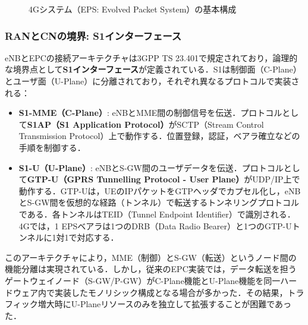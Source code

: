 \begin{figure}[htbp]
  \caption{4Gシステム（EPS: Evolved Packet System）の基本構成}
  \label{fig:epc_architecture}
\end{figure}

\subsubsection{RANとCNの境界: S1インターフェース}
eNBとEPCの接続アーキテクチャは3GPP TS 23.401で規定されており，論理的な境界点として\textbf{S1インターフェース}が定義されている\cite{3GPP_TS23401}．S1は制御面（C-Plane）とユーザ面（U-Plane）に分離されており，それぞれ異なるプロトコルで実装される：
\begin{itemize}
  \item \textbf{S1-MME（C-Plane）}: eNBとMME間の制御信号を伝送．プロトコルとして\textbf{S1AP（S1 Application Protocol）}がSCTP（Stream Control Transmission Protocol）上で動作する\cite{3GPP_TS36413}．位置登録，認証，ベアラ確立などの手順を制御する．
  \item \textbf{S1-U（U-Plane）}: eNBとS-GW間のユーザデータを伝送．プロトコルとして\textbf{GTP-U（GPRS Tunnelling Protocol - User Plane）}がUDP/IP上で動作する\cite{3GPP_TS29281}．GTP-Uは，UEのIPパケットをGTPヘッダでカプセル化し，eNBとS-GW間を仮想的な経路（トンネル）で転送するトンネリングプロトコルである．各トンネルはTEID（Tunnel Endpoint Identifier）で識別される．
  4Gでは，1 EPSベアラは1つのDRB（Data Radio Bearer）と1つのGTP-Uトンネルに1対1で対応する．
\end{itemize}

このアーキテクチャにより，MME（制御）とS-GW（転送）というノード間の機能分離は実現されている．しかし，従来のEPC実装では，データ転送を担うゲートウェイノード（S-GW/P-GW）がC-Plane機能とU-Plane機能を同一ハードウェア内で実装したモノリシック構成となる場合が多かった．その結果，トラフィック増大時にU-Planeリソースのみを独立して拡張することが困難であった．

